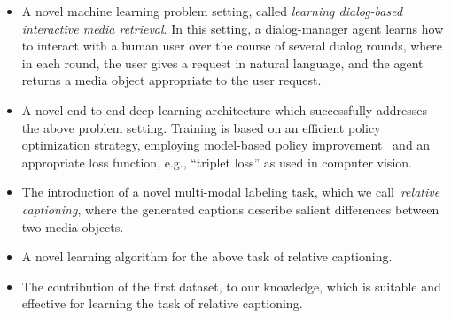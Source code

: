 \begin{itemize}
\item A novel machine learning problem setting, called \emph{learning dialog-based interactive media retrieval}.  In this setting, a dialog-manager agent learns how to interact with a human user over the course of several dialog rounds, where in each round, the user gives a request in natural language, and the agent returns a media object appropriate to the user request. 

\item A novel end-to-end deep-learning architecture which successfully addresses the above problem setting.  Training is based on an efficient policy optimization strategy, employing model-based policy
improvement~\cite{sutton1998reinforcement} and an appropriate loss function, e.g., ``triplet loss'' as used in computer vision.

\item The introduction of a novel multi-modal labeling task, which we call~\emph{relative captioning}, 
where the generated captions describe salient differences between two media objects.

\item A novel learning algorithm for the above task of relative captioning.

\item The contribution of the first dataset, to our knowledge, which is suitable and effective for learning the task of relative captioning.
\end{itemize}



